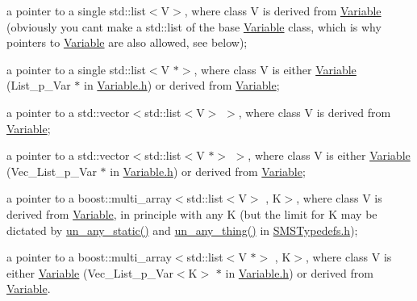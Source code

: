 \begin{DoxyItemize}
\item a pointer to a single std\+::list$<$\+V$>$, where class V is derived from \mbox{\hyperlink{class_s_m_spp__di__unipi__it_1_1_variable}{Variable}} (obviously you can\textquotesingle{}t make a std\+::list of the base \mbox{\hyperlink{class_s_m_spp__di__unipi__it_1_1_variable}{Variable}} class, which is why pointers to \mbox{\hyperlink{class_s_m_spp__di__unipi__it_1_1_variable}{Variable}} are also allowed, see below);
\item a pointer to a single std\+::list$<$\+V $\ast$$>$, where class V is either \mbox{\hyperlink{class_s_m_spp__di__unipi__it_1_1_variable}{Variable}} (List\+\_\+p\+\_\+\+Var $\ast$ in \mbox{\hyperlink{_variable_8h}{Variable.\+h}}) or derived from \mbox{\hyperlink{class_s_m_spp__di__unipi__it_1_1_variable}{Variable}};
\item a pointer to a std\+::vector$<$std\+::list$<$\+V$>$ $>$, where class V is derived from \mbox{\hyperlink{class_s_m_spp__di__unipi__it_1_1_variable}{Variable}};
\item a pointer to a std\+::vector$<$std\+::list$<$\+V $\ast$$>$ $>$, where class V is either \mbox{\hyperlink{class_s_m_spp__di__unipi__it_1_1_variable}{Variable}} (Vec\+\_\+\+List\+\_\+p\+\_\+\+Var $\ast$ in \mbox{\hyperlink{_variable_8h}{Variable.\+h}}) or derived from \mbox{\hyperlink{class_s_m_spp__di__unipi__it_1_1_variable}{Variable}};
\item a pointer to a boost\+::multi\+\_\+array$<$std\+::list$<$\+V$>$ , K$>$, where class V is derived from \mbox{\hyperlink{class_s_m_spp__di__unipi__it_1_1_variable}{Variable}}, in principle with any K (but the limit for K may be dictated by \mbox{\hyperlink{group__boost__any__stuff_ga8ec1a694aa7a5fa58ab801c1ea419fa8}{un\+\_\+any\+\_\+static()}} and \mbox{\hyperlink{group__boost__any__stuff_gab299af634bc1ca9be3a8d45a14560036}{un\+\_\+any\+\_\+thing()}} in \mbox{\hyperlink{_s_m_s_typedefs_8h}{S\+M\+S\+Typedefs.\+h}});
\item a pointer to a boost\+::multi\+\_\+array$<$std\+::list$<$\+V $\ast$$>$ , K$>$, where class V is either \mbox{\hyperlink{class_s_m_spp__di__unipi__it_1_1_variable}{Variable}} (Vec\+\_\+\+List\+\_\+p\+\_\+\+Var$<$\+K$>$ $\ast$ in \mbox{\hyperlink{_variable_8h}{Variable.\+h}}) or derived from \mbox{\hyperlink{class_s_m_spp__di__unipi__it_1_1_variable}{Variable}}.
\end{DoxyItemize}


